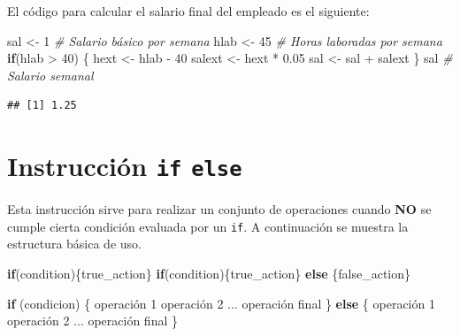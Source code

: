 \documentclass[
]{book}
\newenvironment{Shaded}{\begin{snugshade}}{\end{snugshade}}
\newcommand{\CommentTok}[1]{\textcolor[rgb]{0.56,0.35,0.01}{\textit{#1}}}
\newcommand{\ControlFlowTok}[1]{\textcolor[rgb]{0.13,0.29,0.53}{\textbf{#1}}}
\newcommand{\DecValTok}[1]{\textcolor[rgb]{0.00,0.00,0.81}{#1}}
\newcommand{\FloatTok}[1]{\textcolor[rgb]{0.00,0.00,0.81}{#1}}
\newcommand{\NormalTok}[1]{#1}
\newcommand{\OtherTok}[1]{\textcolor[rgb]{0.56,0.35,0.01}{#1}}
\newcommand{\SpecialCharTok}[1]{\textcolor[rgb]{0.00,0.00,0.00}{#1}}
\begin{document}
El código para calcular el salario final del empleado es el siguiente:

\begin{Shaded}
\begin{Highlighting}[]
\NormalTok{sal }\OtherTok{\textless{}{-}} \DecValTok{1}  \CommentTok{\# Salario básico por semana}
\NormalTok{hlab }\OtherTok{\textless{}{-}} \DecValTok{45}   \CommentTok{\# Horas laboradas por semana}
\ControlFlowTok{if}\NormalTok{(hlab }\SpecialCharTok{\textgreater{}} \DecValTok{40}\NormalTok{) \{}
\NormalTok{  hext }\OtherTok{\textless{}{-}}\NormalTok{ hlab }\SpecialCharTok{{-}} \DecValTok{40}
\NormalTok{  salext }\OtherTok{\textless{}{-}}\NormalTok{ hext }\SpecialCharTok{*} \FloatTok{0.05}
\NormalTok{  sal }\OtherTok{\textless{}{-}}\NormalTok{ sal }\SpecialCharTok{+}\NormalTok{ salext}
\NormalTok{\}}
\NormalTok{sal  }\CommentTok{\# Salario semanal}
\end{Highlighting}
\end{Shaded}

\begin{verbatim}
## [1] 1.25
\end{verbatim}

\hypertarget{instrucciuxf3n-if-else}{%
\section{\texorpdfstring{Instrucción \texttt{if} \texttt{else}}{Instrucción if else}}\label{instrucciuxf3n-if-else}}

Esta instrucción sirve para realizar un conjunto de operaciones cuando \textbf{NO} se cumple cierta condición evaluada por un \texttt{if}. A continuación se muestra la estructura básica de uso.

\begin{Shaded}
\begin{Highlighting}[]
\ControlFlowTok{if}\NormalTok{(condition)\{true\_action\}}
\ControlFlowTok{if}\NormalTok{(condition)\{true\_action\} }\ControlFlowTok{else}\NormalTok{ \{false\_action\}}
\end{Highlighting}
\end{Shaded}

\begin{Shaded}
\begin{Highlighting}[]
\ControlFlowTok{if}\NormalTok{ (condicion) \{}
\NormalTok{  operación }\DecValTok{1}
\NormalTok{  operación }\DecValTok{2}
\NormalTok{  ...}
\NormalTok{  operación final}
\NormalTok{\}}
\ControlFlowTok{else}\NormalTok{ \{}
\NormalTok{  operación }\DecValTok{1}
\NormalTok{  operación }\DecValTok{2}
\NormalTok{  ...}
\NormalTok{  operación final}
\NormalTok{\}}
\end{Highlighting}
\end{Shaded}
\end{document}
